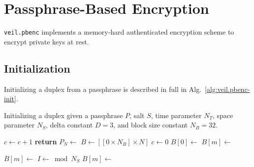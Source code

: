 \section{Passphrase-Based Encryption}\label{sec:veil.pbenc}

\texttt{veil.pbenc} implements a memory-hard authenticated encryption scheme to encrypt private keys at rest.

\subsection{Initialization}\label{subsec:veil.pbenc-init}

Initializing a duplex from a passphrase is described in full in Alg.~\ref{alg:veil.pbenc-init}.

\begin{algorithm}[ht]
    \caption{
        Initializing a duplex given a passphrase $P$, salt $S$, time parameter $N_T$, space parameter $N_S$, delta
        constant $D = 3$, and block size constant $N_B = 32$.
    }
    \begin{algorithmic}
            \State $c \gets c + 1$
            \State {}
            \State {}
            \State {}
            \State \textbf{return} 
        \EndFunction
            \State {}
            \State $P_N \gets$
            \State {}
            \State {}
            \State {}
            \State {}
            \State {}
            \State {}
            \State
            \State $B \gets [[0 \times N_B] \times N]$
            \State $c \gets 0$
            \State
            \State $B[0] \gets $
                \State $B[m] \gets $
            \EndFor
            \State

                    \State $B[m] \gets $
                        \State $I \gets $$ \bmod N_S$
                        \State $B[m] \gets $
                    \EndFor
                \EndFor
            \EndFor
            \State
            \State {}
        \EndProcedure
    \end{algorithmic}
    \label{alg:veil.pbenc-init}
\end{algorithm}

